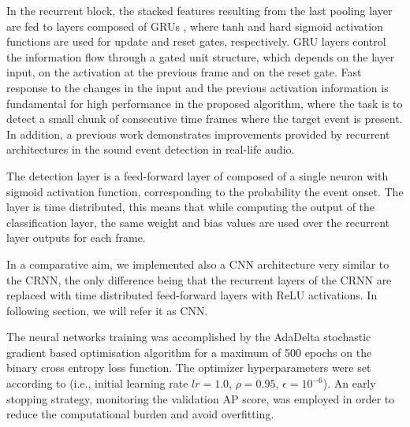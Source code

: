 In the recurrent block, the stacked features resulting from the last pooling layer are fed to layers composed of GRUs \cite{chung2014empirical}, where tanh and hard sigmoid activation functions are used for update and reset gates, respectively.
GRU layers control the information flow through a gated unit structure, which depends on the layer input, on the activation at the previous frame and on the reset gate.
Fast response to the changes in the input and the previous activation information is fundamental for high performance in the proposed algorithm, where the task is to detect a small chunk of consecutive time frames where the target event is present. In addition, a previous work \cite{valenti2017neural} demonstrates improvements provided by recurrent architectures in the sound event detection in real-life audio.

The detection layer is a feed-forward layer of composed of a single neuron with sigmoid activation function, corresponding to the probability the event onset. The layer is time distributed, this means that while computing the output of the classification layer, the same weight and bias values are used over the recurrent layer outputs for each frame.

In a comparative aim, we implemented also a CNN architecture very similar to the CRNN, the only difference being that the recurrent layers of the CRNN are replaced with time distributed feed-forward layers with ReLU activations. In following section, we will refer it as CNN.

The neural networks training was accomplished by the AdaDelta stochastic gradient based optimisation algorithm \cite{zeiler2012adadelta} for a maximum of 500 epochs on the binary cross entropy loss function. The optimizer hyperparameters were set according to \cite{zeiler2012adadelta} (i.e., initial learning rate $lr=1.0$, $\rho=0.95$, $\epsilon=10^{-6}$). An early stopping strategy, monitoring the validation AP score, was employed in order to reduce the computational burden and avoid overfitting. %

